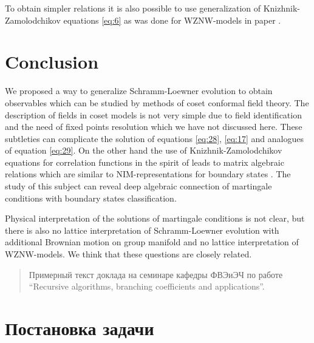 To obtain simpler relations it is also possible to use generalization of Knizhnik-Zamolodchikov equations \eqref{eq:6} as was done for WZNW-models in paper \cite{alekseev2010sle}. 

\section{Conclusion}
\label{sec:conclusion}

We proposed a way to generalize Schramm-Loewner evolution to obtain observables which can be studied by methods of coset conformal field theory. The description of fields in coset models is not very simple due to field identification \cite{schellekens1990field} and the need of  fixed points resolution \cite{Fuchs:1996dd,fuchs1996resolution} which we have not discussed here. These subtleties can complicate the solution of equations  \eqref{eq:28}, \eqref{eq:17} and analogues of equation \eqref{eq:29}. On the other hand the use of Knizhnik-Zamolodchikov equations \cite{kogan1997knizhnik} for correlation functions in the spirit of \cite{alekseev2010sle} leads to matrix algebraic relations which are similar to NIM-representations for boundary states \cite{ishikawa2003novel}. The study of this subject can reveal deep algebraic connection of martingale conditions with boundary states classification. 

Physical interpretation of the solutions of martingale conditions is not clear, but there is also no lattice interpretation of Schramm-Loewner evolution with additional Brownian motion on group manifold \cite{bettelheim2005stochastic} and no lattice interpretation of WZNW-models. We think that these questions are closely related.






\newenvironment{comment}
{\par\noindent{\bf Для заинтересованных читателей}\\}
{\\\setlength{10cm}\\\hfill$\scriptstyle\blacksquare$\par}


\begin{abstract}
Примерный текст доклада на семинаре кафедры ФВЭиЭЧ по работе ``Recursive algorithms, branching coefficients and applications''.
\end{abstract}

\section{Постановка задачи}
\label{sec:task}

